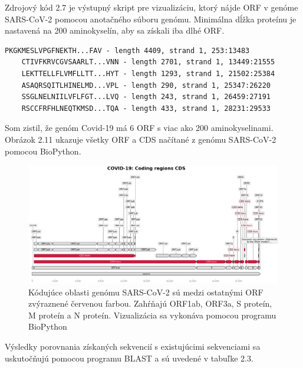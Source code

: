 Zdrojový kód 2.7 je výstupný skript pre vizualizáciu, ktorý nájde ORF v genóme SARS-CoV-2 pomocou anotačného súboru genómu.
Minimálna dĺžka proteínu je nastavená na 200 aminokyselín, aby sa získali iba dlhé ORF.

\begin{lstlisting}[caption=Pozície CDS genómu SARS-CoV-2]
    PKGKMESLVPGFNEKTH...FAV - length 4409, strand 1, 253:13483
    CTIVFKRVCGVSAARLT...VNN - length 2701, strand 1, 13449:21555
    LEKTTELLFLVMFLLTT...HYT - length 1293, strand 1, 21502:25384
    ASAQRSQITLHINELMD...VPL - length 290, strand 1, 25347:26220
    SSGLNELNIILVFLFGT...LVQ - length 243, strand 1, 26459:27191
    RSCCFRFHLNEQTKMSD...TQA - length 433, strand 1, 28231:29533
\end{lstlisting}

Som zistil, že genóm Covid-19 má 6 ORF s viac ako 200 aminokyselinami. Obrázok 2.11 ukazuje všetky ORF a CDS načítané z genómu SARS-CoV-2 pomocou BioPython.

\begin{figure}[!ht]
	\centering
	\includegraphics[width=1\textwidth]{figures/cds.png}
	\caption{Kódujúce oblasti genómu SARS-CoV-2 sú medzi ostatnými ORF zvýraznené červenou farbou. Zahŕňajú ORF1ab, ORF3a, S proteín, M proteín a N proteín. Vizualizácia sa vykonáva pomocou programu BioPython\label{o:latex_friendly_zone}}
\end{figure}

Výsledky porovnania získaných sekvencií s existujúcimi sekvenciami sa uskutočňujú pomocou programu BLAST a sú uvedené v tabuľke 2.3.

